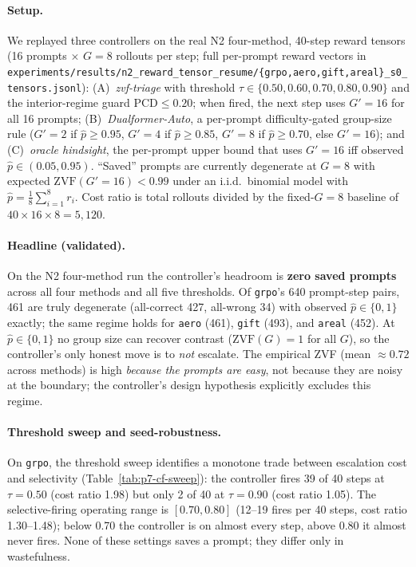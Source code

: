 \documentclass{article}
\begin{document}
\paragraph{Setup.}
We replayed three controllers on the real N2 four-method, 40-step reward
tensors (16 prompts $\times$ $G{=}8$ rollouts per step; full per-prompt
reward vectors in
\texttt{experiments/results/n2\_reward\_tensor\_resume/\{grpo,aero,gift,areal\}\_s0\_tensors.jsonl}):
(A)~\emph{zvf-triage} with threshold $\tau \in \{0.50, 0.60, 0.70, 0.80, 0.90\}$
and the interior-regime guard $\mathrm{PCD} \le 0.20$; when fired, the next
step uses $G'{=}16$ for all 16 prompts;
(B)~\emph{Dualformer-Auto}, a per-prompt
difficulty-gated group-size rule ($G'{=}2$ if
$\hat p \ge 0.95$, $G'{=}4$ if $\hat p \ge 0.85$, $G'{=}8$ if $\hat p \ge
0.70$, else $G'{=}16$); and (C)~\emph{oracle hindsight}, the per-prompt
upper bound that uses $G'{=}16$ iff observed $\hat p \in (0.05, 0.95)$.
``Saved'' prompts are currently degenerate at $G{=}8$ with expected
$\mathrm{ZVF}(G'{=}16) < 0.99$ under an i.i.d.\ binomial model with
$\hat p = \frac{1}{8}\sum_{i=1}^{8} r_i$. Cost ratio is total rollouts
divided by the fixed-$G{=}8$ baseline of $40 \times 16 \times 8 = 5{,}120$.

\paragraph{Headline (validated).}
On the N2 four-method run the controller's headroom is
\textbf{zero saved prompts} across all four methods and all five
thresholds. Of \texttt{grpo}'s 640 prompt-step pairs, 461 are truly
degenerate (all-correct 427, all-wrong 34) with observed
$\hat p \in \{0,1\}$ exactly; the same regime holds for
\texttt{aero} (461), \texttt{gift} (493), and \texttt{areal} (452).
At $\hat p \in \{0,1\}$ no group size can recover contrast
($\mathrm{ZVF}(G) = 1$ for all $G$), so the controller's only honest
move is to \emph{not} escalate. The empirical ZVF (mean $\approx 0.72$
across methods) is high \emph{because the prompts are easy}, not because
they are noisy at the boundary; the controller's design hypothesis
explicitly excludes this regime.

\paragraph{Threshold sweep and seed-robustness.}
On \texttt{grpo}, the threshold sweep identifies a monotone trade
between escalation cost and selectivity (Table~\ref{tab:p7-cf-sweep}):
the controller fires 39 of 40 steps at $\tau{=}0.50$ (cost ratio 1.98)
but only 2 of 40 at $\tau{=}0.90$ (cost ratio 1.05). The selective-firing
operating range is $[0.70, 0.80]$ (12--19 fires per 40 steps,
cost ratio 1.30--1.48); below 0.70 the controller is on almost every
step, above 0.80 it almost never fires. None of these settings saves a
prompt; they differ only in wastefulness.
\end{document}

